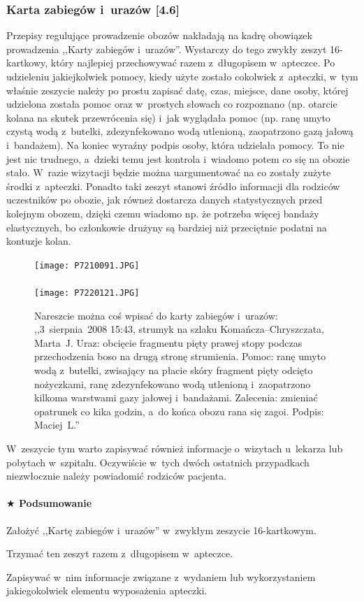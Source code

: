 \documentclass[a5paper,10pt,titlepage,twoside]{article}
\newcommand*{\thecheckbox}{\hss$\Box$} %
\newenvironment*{checklist}
{\list{}{%
\renewcommand*{\makelabel}[1]{\thecheckbox}}}
{\endlist}
\begin{document}
\subsubsection{Karta zabiegów i~urazów [4.6]}
Przepisy regulujące prowadzenie obozów nakładają na kadrę obowiązek prowadzenia ,,Karty zabiegów i~urazów''. Wystarczy do tego zwykły zeszyt 16-kartkowy, który najlepiej przechowywać razem z~długopisem w~apteczce. Po udzieleniu jakiejkolwiek pomocy, kiedy użyte zostało cokolwiek z~apteczki, w~tym właśnie zeszycie należy po prostu zapisać datę, czas, miejsce, dane osoby, której udzielona została pomoc oraz w~prostych słowach co rozpoznano (np. otarcie kolana na skutek przewrócenia się) i~jak wyglądała pomoc (np. ranę umyto czystą wodą z~butelki, zdezynfekowano wodą utlenioną, zaopatrzono gazą jałową i~bandażem). Na koniec wyraźny podpis osoby, która udzielała pomocy. To nie jest nic trudnego, a~dzieki temu jest kontrola i~wiadomo potem co się na obozie stało. W~razie wizytacji będzie można uargumentować na co zostały zużyte środki z~apteczki. Ponadto taki zeszyt stanowi źródło informacji dla rodziców uczestników po obozie, jak równeż dostarcza danych statystycznych przed kolejnym obozem, dzięki czemu wiadomo np. że potrzeba więcej bandaży elastycznych, bo członkowie drużyny są bardziej niż przeciętnie podatni na kontuzje kolan.
\begin{figure}[htp]
\centering
\texttt{[image: P7210091.JPG]}\\
~~~~~~~~\\
\texttt{[image: P7220121.JPG]}
\caption{Nareszcie można coś wpisać do karty zabiegów i~urazów: ,,3~sierpnia~2008 15:43, strumyk na szlaku Komańcza--Chryszczata, Marta~J. Uraz: obcięcie fragmentu pięty prawej stopy podczas przechodzenia boso na drugą stronę strumienia. Pomoc: ranę umyto wodą z~butelki, zwisający na płacie skóry fragment pięty odcięto nożyczkami, ranę zdezynfekowano wodą utlenioną i~zaopatrzono kilkoma warstwami gazy jałowej i~bandażami. Zalecenia: zmieniać opatrunek co kika godzin, a~do końca obozu rana się zagoi. Podpis: Maciej~L.''}\label{fig:pieta}
\end{figure}


W~zeszycie tym warto zapisywać również informacje o~wizytach u~lekarza lub pobytach w~szpitalu. Oczywiście w~tych dwóch ostatnich przypadkach niezwłocznie należy powiadomić rodziców pacjenta.
\paragraph{$\bigstar$ Podsumowanie}
\begin{checklist}
\item Założyć ,,Kartę zabiegów i~urazów'' w~zwykłym zeszycie 16-kartkowym.
\item Trzymać ten zeszyt razem z~długopisem w~apteczce.
\item Zapisywać w~nim informacje związane z~wydaniem lub wykorzystaniem jakiegokolwiek elementu wyposażenia apteczki.
\end{checklist}
\end{document}
